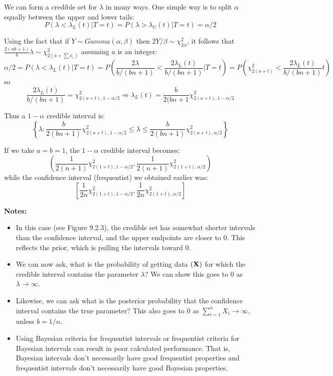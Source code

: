 \documentclass[11pt,]{article}
\def\bX{{\bf X}}
\def\sumin{\sum_{i=1}^n}
\begin{document}
We can form a credible set for \(\lambda\) in many ways. One simple way
is to split \(\alpha\) equally between the upper and lower tails:
\[P(\lambda < \lambda_L(t) |T = t) = P(\lambda > \lambda_U(t) | T = t) = \alpha/2\]

Using the fact that if \(Y\sim Gamma(\alpha,\beta)\) then
\(2Y/\beta \sim \chi^2_{2\alpha}\), it follows that
\(\frac{2(nb+1)}{b}\lambda \sim \chi^2_{2(a+\sum x_i)}\) assuming \(a\)
is an integer:
\[\alpha/2 = P(\lambda < \lambda_L(t) | T = t) = P\left(\frac{2\lambda}{b/(bn+1)} < \frac{2\lambda_L(t)}{b/(bn+1)} | T = t\right) = P\left(\chi^2_{2(a+t)} <\frac{2\lambda_L(t)}{b/(bn+1)} t\right)
\] so
\[ \frac{2\lambda_L(t)}{b/(bn+1)} = \chi^2_{2(a+t),1-\alpha/2} \Rightarrow \lambda_L(t) = \frac{b}{2(bn+1}\chi^2_{2(a+t),1-\alpha/2}\]

Thus a \(1-\alpha\) credible interval is:
\[ \left\{\lambda: \frac{b}{2(bn+1)}\chi^2_{2(a+t),1-\alpha/2} \leq \lambda \leq  \frac{b}{2(bn+1)}\chi^2_{2(a+t),\alpha/2} \right\}\]

If we take \(a = b = 1\), the \(1-\alpha\) credible interval becomes:
\[\left( \frac{1}{2(n+1) }\chi^2_{2(1+t),1-\alpha/2},\frac{1}{2(n+1) }\chi^2_{2(1+t),\alpha/2}\right)\]
while the confidence interval (frequentist) we obtained earlier was:
\[\left[ \frac{1}{2n }\chi^2_{2(1+t),1-\alpha/2},\frac{1}{2n }\chi^2_{2(1+t),\alpha/2}\right]\]

\textbf{Notes:}

\begin{itemize}
\item In this case (see Figure 9.2.3), the credible set has somewhat shorter intervals than the confidence interval, and the upper endpoints are closer to 0. This reflects the prior, which is pulling the intervals toward 0.
\item We can now ask, what is the probability of getting data $(\bX)$ for which the credible interval contains the parameter $\lambda$? We can show this goes to 0 as $\lambda \to \infty$.
\item Likewise, we can ask what is the posterior probability that the confidence interval contains the true parameter? This also goes to 0 as $\sumin X_i \to \infty$, unless $b  = 1/n$.
\item Using Bayesian criteria for frequentist intervals or frequentist criteria for Bayesian intervals can result in poor calculated performance. That is, Bayesian intervals don't necessarily have good frequentist properties and frequentist intervals don't necessarily have good Bayesian properties.
\end{itemize}
\end{document}
